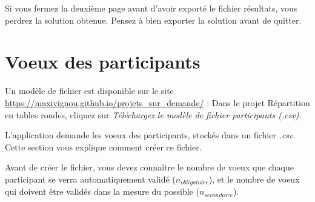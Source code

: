 \documentclass[11pt,a4paper]{article}
\newcommand{\nomproduit}{Répartition en tables rondes}
\begin{document}
\begin{danger}
Si vous fermez la deuxième page avant d'avoir exporté le fichier résultats, vous perdrez la solution obtenue. Pensez à bien exporter la solution avant de quitter.
\end{danger}

\section{Voeux des participants}
\label{sec:voeux}
\begin{note}
Un modèle de fichier est disponible sur le site \url{https://maxivignou.github.io/projets_sur_demande/} : Dans le projet \nomproduit{}, cliquez sur \textit{Téléchargez le modèle de fichier participants (.csv)}.
\end{note}
L'application demande les voeux des participants, stockés dans un fichier \textit{.csv}. Cette section vous explique comment créer ce fichier.
\begin{astuce}
Avant de créer le fichier, vous devez connaître le nombre de voeux que chaque participant se verra automatiquement validé ($n_{obligatoire}$), et le nombre de voeux qui doivent être validés dans la mesure du possible ($n_{secondaire}$).
\end{astuce}
\end{document}
